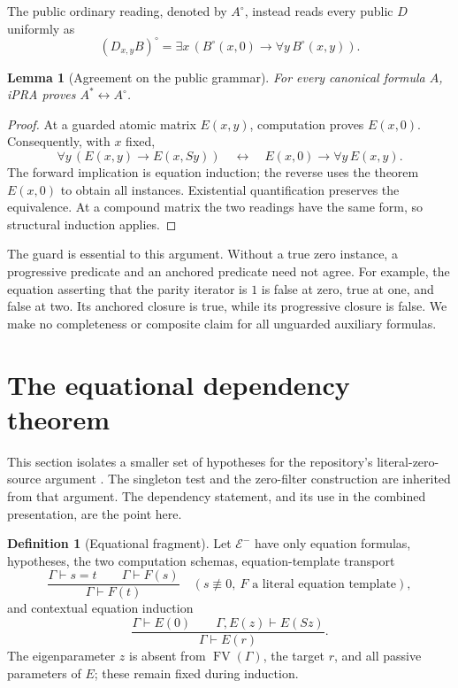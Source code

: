 \documentclass[11pt,letterpaper]{article}
\newtheorem{lemma}[theorem]{Lemma}
\theoremstyle{definition}
\newtheorem{definition}[theorem]{Definition}
\newcommand{\EE}{\mathcal E^{-}}
\newcommand{\synneq}{\not\equiv}
\newcommand{\FV}{\operatorname{FV}}
\begin{document}
The public ordinary reading, denoted by $A^\circ$, instead reads every
public $D$ uniformly as
\[
 (D_{x,y}B)^\circ=\exists x\,(B^\circ(x,0)\to\forall y\,B^\circ(x,y)).
 \tag{O}\label{eq:ordinary}
\]

\begin{lemma}[Agreement on the public grammar]
For every canonical formula $A$, iPRA proves $A^*\leftrightarrow A^\circ$.
\end{lemma}
\begin{proof}
At a guarded atomic matrix $E(x,y)$, computation proves $E(x,0)$.
Consequently, with $x$ fixed,
\[
 \forall y\,(E(x,y)\to E(x,Sy))
 \quad\longleftrightarrow\quad
 E(x,0)\to\forall y\,E(x,y).
\]
The forward implication is equation induction; the reverse uses the
theorem $E(x,0)$ to obtain all instances. Existential quantification
preserves the equivalence. At a compound matrix the two readings have the
same form, so structural induction applies.
\end{proof}

The guard is essential to this argument. Without a true zero instance, a
progressive predicate and an anchored predicate need not agree. For example,
the equation asserting that the parity iterator is $1$ is false at zero,
true at one, and false at two. Its anchored closure is true, while its
progressive closure is false. We make no completeness or composite claim
for all unguarded auxiliary formulas.

\section{The equational dependency theorem}
\label{sec:equational}

This section isolates a smaller set of hypotheses for the repository's
literal-zero-source argument \cite{source}. The singleton test and the
zero-filter construction are inherited from that argument. The dependency
statement, and its use in the combined presentation, are the point here.

\begin{definition}[Equational fragment]
Let $\EE$ have only equation formulas, hypotheses, the two computation
schemas, equation-template transport
\[
 \frac{\Gamma\vdash s=t\qquad\Gamma\vdash F(s)}{\Gamma\vdash F(t)}
 \quad(s\synneq0,\ F\text{ a literal equation template}),
 \tag{Tr$^-$}\label{eq:trminus}
\]
and contextual equation induction
\[
 \frac{\Gamma\vdash E(0)\qquad\Gamma,E(z)\vdash E(Sz)}
      {\Gamma\vdash E(r)}.
 \tag{EI}\label{eq:ei}
\]
The eigenparameter $z$ is absent from $\FV(\Gamma)$, the target $r$, and
all passive parameters of $E$; these remain fixed during induction.
\end{definition}
\end{document}
